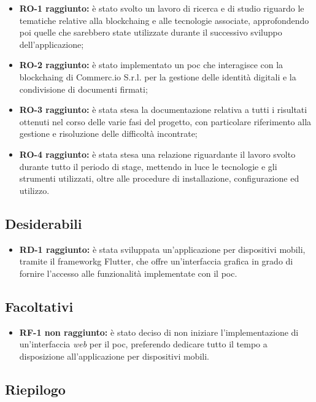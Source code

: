 \begin{itemize}
	\item \textbf{RO-1 raggiunto:} è stato svolto un lavoro di ricerca e di studio riguardo le tematiche relative alla \gls{blockchaing} e alle tecnologie associate, approfondendo poi quelle che sarebbero state utilizzate durante il successivo sviluppo dell'applicazione;
	\item \textbf{RO-2 raggiunto:} è stato implementato un \gls{poc} che interagisce con la \gls{blockchaing} di Commerc.io S.r.l. per la gestione delle identità digitali e la condivisione di documenti firmati;
	\item \textbf{RO-3 raggiunto:} è stata stesa la documentazione relativa a tutti i risultati ottenuti nel corso delle varie fasi del progetto, con particolare riferimento alla gestione e risoluzione delle difficoltà incontrate;
	\item \textbf{RO-4 raggiunto:} è stata stesa una relazione riguardante il lavoro svolto durante tutto il periodo di stage, mettendo in luce le tecnologie e gli strumenti utilizzati, oltre alle procedure di installazione, configurazione ed utilizzo.
\end{itemize}

\subsection{Desiderabili}

\begin{itemize}
	\item \textbf{RD-1 raggiunto:} è stata sviluppata un'applicazione per dispositivi mobili, tramite il \gls{frameworkg} Flutter, che offre un'interfaccia grafica in grado di fornire l'accesso alle funzionalità implementate con il \gls{poc}.
\end{itemize}

\subsection{Facoltativi}

\begin{itemize}
	\item \textbf{RF-1 non raggiunto:} è stato deciso di non iniziare l'implementazione di un'interfaccia \textit{web} per il \gls{poc}, preferendo dedicare tutto il tempo a disposizione all'applicazione per dispositivi mobili.
\end{itemize}

\subsection{Riepilogo}

